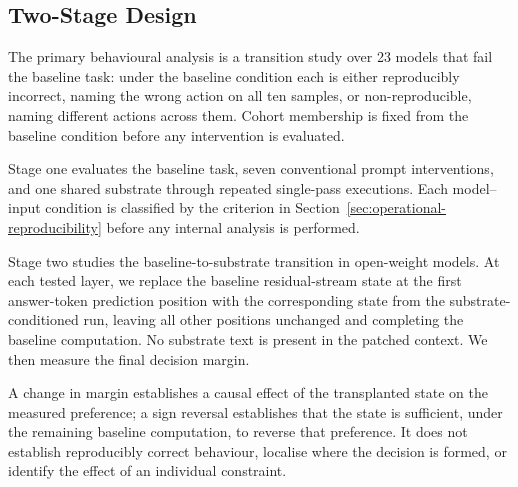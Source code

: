 \subsection{Two-Stage Design}
\label{sec:two-stage-design}

The primary behavioural analysis is a transition study over 23 models
that fail the baseline task: under the baseline condition each is
either reproducibly incorrect, naming the wrong action on all ten
samples, or non-reproducible, naming different actions across them.
Cohort membership is fixed from the baseline condition before any
intervention is evaluated.

Stage one evaluates the baseline task, seven conventional prompt
interventions, and one shared substrate through repeated single-pass
executions. Each model--input condition is classified by the criterion
in Section~\ref{sec:operational-reproducibility} before any internal
analysis is performed.

Stage two studies the baseline-to-substrate transition in open-weight
models. At each tested layer, we replace the baseline residual-stream
state at the first answer-token prediction position with the
corresponding state from the substrate-conditioned run, leaving all
other positions unchanged and completing the baseline computation.
No substrate text is present in the patched context. We then
measure the final decision margin.

A change in margin establishes a causal effect of the transplanted
state on the measured preference; a sign reversal establishes that the
state is sufficient, under the remaining baseline computation, to
reverse that preference. It does not establish reproducibly correct
behaviour, localise where the decision is formed, or identify the
effect of an individual constraint.
